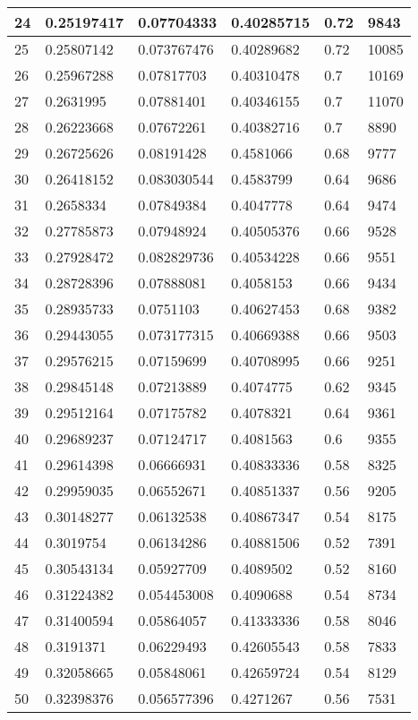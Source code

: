 \begin{longtable}{|l|l|l|l|l|l|}
24 & 0.25197417 & 0.07704333 & 0.40285715 & 0.72 & 9843 \\ \hline 
25 & 0.25807142 & 0.073767476 & 0.40289682 & 0.72 & 10085 \\ \hline 
26 & 0.25967288 & 0.07817703 & 0.40310478 & 0.7 & 10169 \\ \hline 
27 & 0.2631995 & 0.07881401 & 0.40346155 & 0.7 & 11070 \\ \hline 
28 & 0.26223668 & 0.07672261 & 0.40382716 & 0.7 & 8890 \\ \hline 
29 & 0.26725626 & 0.08191428 & 0.4581066 & 0.68 & 9777 \\ \hline 
30 & 0.26418152 & 0.083030544 & 0.4583799 & 0.64 & 9686 \\ \hline 
31 & 0.2658334 & 0.07849384 & 0.4047778 & 0.64 & 9474 \\ \hline 
32 & 0.27785873 & 0.07948924 & 0.40505376 & 0.66 & 9528 \\ \hline 
33 & 0.27928472 & 0.082829736 & 0.40534228 & 0.66 & 9551 \\ \hline 
34 & 0.28728396 & 0.07888081 & 0.4058153 & 0.66 & 9434 \\ \hline 
35 & 0.28935733 & 0.0751103 & 0.40627453 & 0.68 & 9382 \\ \hline 
36 & 0.29443055 & 0.073177315 & 0.40669388 & 0.66 & 9503 \\ \hline 
37 & 0.29576215 & 0.07159699 & 0.40708995 & 0.66 & 9251 \\ \hline 
38 & 0.29845148 & 0.07213889 & 0.4074775 & 0.62 & 9345 \\ \hline 
39 & 0.29512164 & 0.07175782 & 0.4078321 & 0.64 & 9361 \\ \hline 
40 & 0.29689237 & 0.07124717 & 0.4081563 & 0.6 & 9355 \\ \hline 
41 & 0.29614398 & 0.06666931 & 0.40833336 & 0.58 & 8325 \\ \hline 
42 & 0.29959035 & 0.06552671 & 0.40851337 & 0.56 & 9205 \\ \hline 
43 & 0.30148277 & 0.06132538 & 0.40867347 & 0.54 & 8175 \\ \hline 
44 & 0.3019754 & 0.06134286 & 0.40881506 & 0.52 & 7391 \\ \hline 
45 & 0.30543134 & 0.05927709 & 0.4089502 & 0.52 & 8160 \\ \hline 
46 & 0.31224382 & 0.054453008 & 0.4090688 & 0.54 & 8734 \\ \hline 
47 & 0.31400594 & 0.05864057 & 0.41333336 & 0.58 & 8046 \\ \hline 
48 & 0.3191371 & 0.06229493 & 0.42605543 & 0.58 & 7833 \\ \hline 
49 & 0.32058665 & 0.05848061 & 0.42659724 & 0.54 & 8129 \\ \hline 
50 & 0.32398376 & 0.056577396 & 0.4271267 & 0.56 & 7531 \\ \hline 
\end{longtable}
